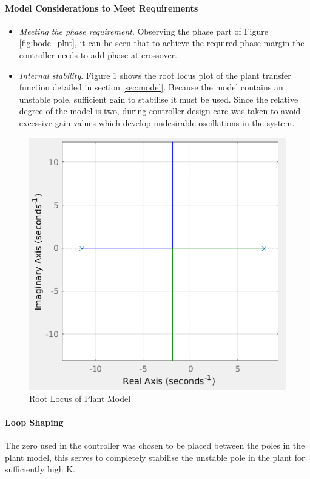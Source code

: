 \documentclass[11pt, a4paper,twocolumn]{article}
\begin{document}
	\paragraph{		Model Considerations to Meet Requirements }
		
	\begin{itemize}
		\item \textit{Meeting the phase requirement}. Observing the phase part of Figure \ref{fig:bode_plnt}, it can be seen that to achieve the required phase margin the controller needs to add phase at crossover.
		\item \textit{Internal stability}. Figure \ref{fig:rl_plnt} shows the root locus plot of the plant transfer function detailed in section \ref{sec:model}. Because the model contains an unstable pole, sufficient gain to stabilise it must be used. Since the relative degree of the model is two, during controller design care was taken to avoid excessive gain values which develop undesirable oscillations in the system.
	\end{itemize}				
		
		\begin{figure}[h!]
			\centering
			\includegraphics[scale=0.4]{rlocus_plant}
			\caption{Root Locus of Plant Model}
			\label{fig:rl_plnt}
		\end{figure}
						
			
	\paragraph{		Loop Shaping\\		}
			The zero used in the controller was chosen to be placed between the poles in the plant model, this serves to completely stabilise the unstable pole in the plant for sufficiently high K. 
			
\end{document}
